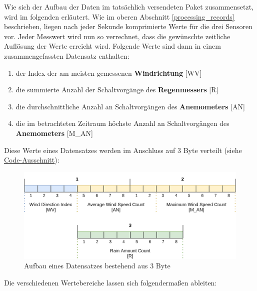 \documentclass[12pt]{article}
\begin{document}
      Wie sich der Aufbau der Daten im tatsächlich versendeten Paket zusammensetzt, wird im folgenden erläutert.
      Wie im oberen Abschnitt \underline{\ref{processing_records}} beschrieben, liegen nach jeder Sekunde komprimierte Werte für die drei Sensoren vor.
      Jeder Messwert wird nun so verrechnet, dass die gewünschte zeitliche Auflösung der Werte erreicht wird.
      Folgende Werte sind dann in einem zusammengefassten Datensatz enthalten:

      \begin{enumerate}
        \item der Index der am meisten gemessenen \textbf{Windrichtung} [WV]
        \item die summierte Anzahl der Schaltvorgänge des \textbf{Regenmessers} [R]
        \item die durchschnittliche Anzahl an Schaltvorgängen des \textbf{Anemometers} [AN]
        \item die im betrachteten Zeitraum höchste Anzahl an Schaltvorgängen des \textbf{Anemometers} [M\_AN]
      \end{enumerate}

      Diese Werte eines Datensatzes werden im Anschluss auf 3 Byte verteilt (siehe \href{https://github.com/HTWDD-RN/LoRaWAN-Wetterstation-SEN-15901/blob/21bf650ae923dba30d39e37641f77aa94702a314/src/lora_weather_station/lora_weather_station.ino#L120}{Code-Ausschnitt}):

      \begin{figure}[H]
        \centering
        \includegraphics[scale=0.2]{Record_Byte_Representation.png}
        \caption{Aufbau eines Datensatzes bestehend aus 3 Byte}
      \end{figure}

      Die verschiedenen Wertebereiche lassen sich folgendermaßen ableiten:
\end{document}
